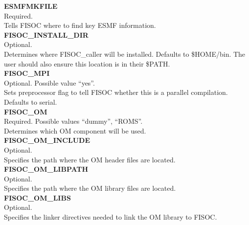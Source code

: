 \documentclass[12pt]{article}
\begin{document}
\begin{flushleft}
\textbf{ESMFMKFILE}                                \\ 
Required.                                          \\
Tells FISOC where to find key ESMF information.    \\
\vspace{6pt}
\textbf{FISOC\_INSTALL\_DIR}                       \\ 
Optional.                                          \\
Determines where FISOC\_caller will be installed. Defaults to \$HOME/bin. 
The user should also ensure this location is in their \$PATH. \\
\vspace{6pt}
\textbf{FISOC\_MPI}                                \\ 
Optional. Possible value ``yes''.                  \\
Sets preprocessor flag to tell FISOC whether this is a parallel compilation.
Defaults to serial.                                \\
\vspace{6pt}
\textbf{FISOC\_OM}                                 \\ 
Required. Possible values ``dummy'', ``ROMS''.     \\
Determines which OM component will be used.        \\
\vspace{6pt}
\textbf{FISOC\_OM\_INCLUDE}                       \\ 
Optional.                                          \\
Specifies the path where the OM header files are located.\\
\vspace{6pt}
\textbf{FISOC\_OM\_LIBPATH}                       \\
Optional.                                          \\
Specifies the path where the OM library files are located.\\
\vspace{6pt}
\textbf{FISOC\_OM\_LIBS}                          \\
Optional.                                          \\
Specifies the linker directives needed to link the OM library to FISOC. \\
\vspace{6pt}

\end{flushleft}
\end{document}
